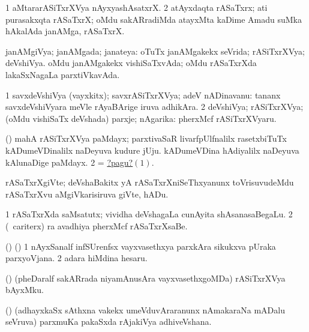 \noindent
\gl{\pagu}
\bmng
\bnum
\num{1}  aMtararASiTxrXVya nAyxyashAsatxrX. 
\num{2}  atAyxdaqta rASaTxrx; ati purasakxqta rASaTxrX; oMdu sakARradiMda atayxMta kaDime Amadu suMka hAkalAda janAMga, rASaTxrX. 
\enum
\emng
\eentry

\bentry
{}
\gl{\gu}
\bmng
janAMgiVya; janAMgada; janateya: 
\banum
{} oTuTx janAMgakekx seVrida; rASiTxrXVya; deVshiVya. 
 oMdu janAMgakekx vishiSaTxvAda; oMdu rASaTxrXda lakaSxNagaLa parxtiVkavAda. 
\eanum
\emng
\eentry

\bentry
{}
\gl{\nA}
\bmng
\bnum
\num{1} savxdeVshiVya (vayxkitx); savxrASiTxrXVya; adeV nADinavanu:  tananx savxdeVshiVyara meVle rAyaBArige iruva adhikAra. 
\num{2} deVshiVya; rASiTxrXVya; (oMdu vishiSaTx deVshada) parxje; nAgarika:  pherxMcf rASiTxrXVyaru. 
\enum
\emng

\noindent
\gl{\pagu}
\bmng
\hypertarget{national2pagu1}{} 
\bnum
{}  (\birx) 
\banum
{} mahA rASiTxrXVya paMdayx; parxtivaSaR livarfpUlfnalilx rasetxbiTuTx kADumeVDinalilx naDeyuva kudure jUju. 
 kADumeVDina hAdiyalilx naDeyuva kAlunaDige paMdayx. 
\eanum
\numie
\num{2}  = \hyperlink{national2pagu1}{?pagu?\((1)\)}. 
\enum
\emng
\eentry

\bentry
{}
\gl{\nA}
\bmng
rASaTxrXgiVte; deVshaBakitx yA rASaTxrXniSeThxyanunx toVrisuvudeMdu rASaTxrXvu aMgiVkarisiruva giVte, hADu. 
\emng
\eentry

\bentry
{}
\gl{\nA}
\bmng
\bnum
\num{1} rASaTxrXda saMsatutx; vividha deVshagaLa cunAyita shAsanasaBegaLu. 
\num{2} (\kanmu\ cariterx) ra avadhiya pherxMcf rASaTxrXsaBe. 
\enum
\emng
\eentry

\bentry
{}
\gl{\nA}
\bmng
(\ca) (\birx) 
\bnum
\num{1} nAyxSanalf infSUrenfsx vayxvasethxya parxkAra sikukxva pUraka parxyoVjana. 
\num{2} adara hiMdina hesaru. 
\enum
\emng
\eentry

\bentry
{}
\gl{\nA}
\bmng
(\ame) (pheDaralf sakARrada niyamAnusAra vayxvasethxgoMDa) rASiTxrXVya bAyxMku. 
\emng
\eentry

\bentry
{}
\gl{\nA}
\bmng
(\ame) (adhayxkaSx sAthxna \mo vakekx umeVduvAraranunx nAmakaraNa mADalu seVruva) parxmuKa pakaSxda rAjakiVya adhiveVshana. 
\emng
\eentry

